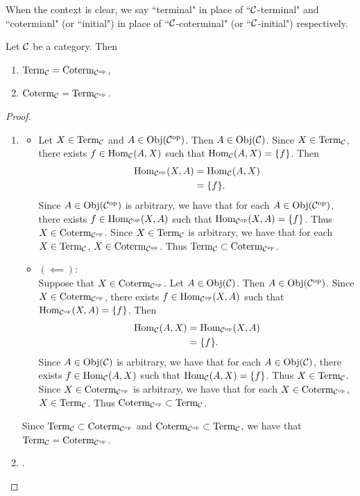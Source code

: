 \documentclass{book}
\begin{document}
	\begin{note}
		When the context is clear, we say ``terminal" in place of ``$\MC$-terminal" and ``cotermianl" (or ``initial") in place of ``$\MC$-coterminal" (or ``$\MC$-initial") respectively. 
	\end{note}
	
	\begin{ex} 
		Let $\MC$ be a category. Then 
		\begin{enumerate}
			\item $\Term_{\MC} = \Coterm_{\op{\MC}}$,
			\item $\Coterm_{\MC} = \Term_{\op{\MC}}$.
		\end{enumerate}
	\end{ex}
	
	\begin{proof}\
		\begin{enumerate}
			\item 
			\begin{itemize}
				\item Let $X \in \Term_{\MC}$ and $A \in \Obj(\op{\MC})$. Then $A \in \Obj(\MC)$. Since $X \in \Term_{\MC}$, there exists $f \in \Hom_{\MC}(A, X)$ such that $\Hom_{\MC}(A,X) = \{f\}$. Then 
				\begin{align*}
					\Hom_{\op{\MC}}(X, A) 
					& = \Hom_{\MC}(A, X) \\
					& = \{f\}.
				\end{align*}
				Since $A \in \Obj(\op{\MC})$ is arbitrary, we have that for each $A \in \Obj(\op{\MC})$, there exists $f \in \Hom_{\op{\MC}}(X, A)$ such that $\Hom_{\op{\MC}}(X, A) = \{f\}$. Thus $X \in \Coterm_{\op{\MC}}$. Since $X \in \Term_{\MC}$ is arbitrary, we have that for each $X \in \Term_{\MC}$, $X \in \Coterm_{\op{\MC}}$. Thus $\Term_{\MC} \subset \Coterm_{\op{\MC}}$.
				\item $(\impliedby)$: \\
				Suppose that $X \in \Coterm_{\op{\MC}}$. Let $A \in \Obj(\MC)$. Then $A \in \Obj(\op{\MC})$. Since $X \in \Coterm_{\op{\MC}}$, there exists $f \in \Hom_{\op{\MC}}(X,A)$ such that $\Hom_{\op{\MC}}(X,A) = \{f\}$. Then 
				\begin{align*}
					\Hom_{\MC}(A, X) 
					& = \Hom_{\op{\MC}}(X, A) \\
					& = \{f\}.
				\end{align*}
				Since $A \in \Obj(\MC)$ is arbitrary, we have that for each $A \in \Obj(\MC)$, there exists $f \in \Hom_{\MC}(A, X)$ such that $\Hom_{\MC}(A, X)  = \{f\}$. Thus $X \in \Term_{\MC}$. Since $X \in \Coterm_{\op{\MC}}$ is arbitrary, we have that for each $X \in \Coterm_{\op{\MC}}$, $X \in \Term_{\MC}$. Thus $\Coterm_{\op{\MC}} \subset \Term_{\MC}$.
			\end{itemize}
			Since $\Term_{\MC} \subset \Coterm_{\op{\MC}}$ and $\Coterm_{\op{\MC}} \subset \Term_{\MC}$, we have that $\Term_{\MC} = \Coterm_{\op{\MC}}$.
			\item \tcr{similar to prev part}.
		\end{enumerate}
	\end{proof}
	
\end{document}
